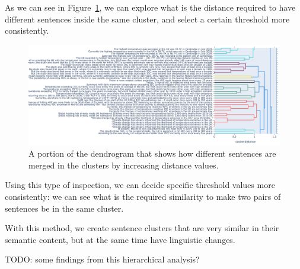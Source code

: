
As we can see in Figure~\ref{fig:dendrogram}, we can explore what is the distance required to have different sentences inside the same cluster, and select a certain threshold more consistently.
\begin{figure}[!htb]
    \centering
    \includegraphics[width=\linewidth]{figures/dendrogram.png}
    \caption{A portion of the dendrogram that shows how different sentences are merged in the clusters by increasing distance values.}
    \label{fig:dendrogram}
\end{figure}

Using this type of inspection, we can decide specific threshold values more consistently: we can see what is the required similarity to make two pairs of sentences be in the same cluster.

With this method, we create sentence clusters that are very similar in their semantic content, but at the same time have linguistic changes.

TODO: some findings from this hierarchical analysis?

